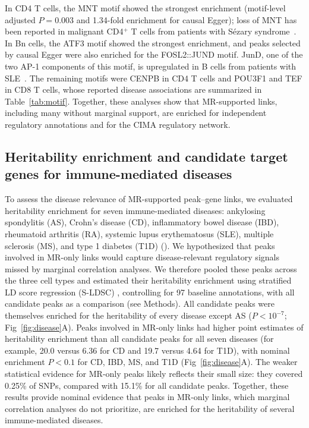 \noindent In CD4 T cells, the MNT motif showed the strongest enrichment (motif-level adjusted \(P=0.003\) and 1.34-fold enrichment for causal Egger); loss of MNT has been reported in malignant CD4\(^+\) T cells from patients with S\'{e}zary syndrome~\cite{vermeer2008mnt}. In Bn cells, the ATF3 motif showed the strongest enrichment, and peaks selected by causal Egger were also enriched for the FOSL2::JUND motif. JunD, one of the two AP-1 components of this motif, is upregulated in B cells from patients with SLE~\cite{wu2024jund}. The remaining motifs were CENPB in CD4 T cells and POU3F1 and TEF in CD8 T cells, whose reported disease associations are summarized in Table~\ref{tab:motif}. Together, these analyses show that MR-supported links, including many without marginal support, are enriched for independent regulatory annotations and for the CIMA regulatory network.

\subsection{Heritability enrichment and candidate target genes for immune-mediated diseases}

To assess the disease relevance of MR-supported peak--gene links, we evaluated heritability enrichment for seven immune-mediated diseases: ankylosing spondylitis (AS), Crohn's disease (CD), inflammatory bowel disease (IBD), rheumatoid arthritis (RA), systemic lupus erythematosus (SLE), multiple sclerosis (MS), and type 1 diabetes (T1D) (). We hypothesized that peaks involved in MR-only links would capture disease-relevant regulatory signals missed by marginal correlation analyses. We therefore pooled these peaks across the three cell types and estimated their heritability enrichment using stratified LD score regression (S-LDSC) \cite{finucane2015sldsc}, controlling for 97 baseline annotations, with all candidate peaks as a comparison (see Methods). All candidate peaks were themselves enriched for the heritability of every disease except AS (\(P<10^{-7}\); Fig~\ref{fig:disease}A). Peaks involved in MR-only links had higher point estimates of heritability enrichment than all candidate peaks for all seven diseases (for example, 20.0 versus 6.36 for CD and 19.7 versus 4.64 for T1D), with nominal enrichment \(P<0.1\) for CD, IBD, MS, and T1D (Fig~\ref{fig:disease}A). The weaker statistical evidence for MR-only peaks likely reflects their small size: they covered 0.25\% of SNPs, compared with 15.1\% for all candidate peaks. Together, these results provide nominal evidence that peaks in MR-only links, which marginal correlation analyses do not prioritize, are enriched for the heritability of several immune-mediated diseases.

